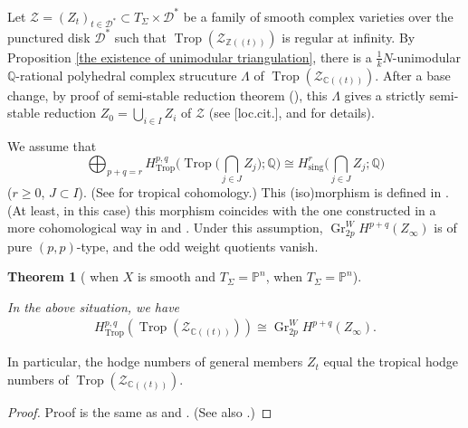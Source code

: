 \documentclass[12pt,a4]{amsart}
\newtheorem{thm}{Theorem}[section]
\def\P{\mathbb{P}}
\def\Q{\mathbb{Q}}
\def\Gr{\mathop{\mathrm{Gr}}\nolimits}
\def\sing{\mathop{\mathrm{sing}}\nolimits}
\def\Trop{\mathop{\mathrm{trop}}\nolimits}
\def\Trop{\mathop{\mathrm{Trop}}\nolimits}
\def\Gr{\mathop{\mathrm{Gr}}\nolimits}
\numberwithin{equation}{section}
\numberwithin{figure}{section}
\begin{document}
  Let  
   $\mathcal{Z} = (Z_t)_{t \in \mathcal{D}^*} \subset T_{\Sigma} \times \mathcal{D}^{*}$ 
   be a family 
   of smooth complex varieties 
   over the punctured disk $\mathcal{D}^*$
   such that $\Trop(\mathcal{Z}_{\mathbb{Z}((t))})$ is regular at infinity.
   By Proposition \ref{the existence of unimodular triangulation}, 
   there is a 
   $\frac{1}{k}N$-unimodular
    $\Q$-rational polyhedral complex strucuture $\Lambda$
    of $\Trop(\mathcal{Z}_{\mathbb{C}((t))})$.
   After a base change, 
   by proof of semi-stable reduction theorem (\cite{KempfKnudsenMumfordSaint-DonatToroidalEmbeddings11973}), 
   this $\Lambda$ gives 
   a strictly semi-stable reduction 
    $Z_0 = \bigcup_{i \in I} Z_i$ 
   of $\mathcal{Z}$ (see [loc.cit.], 
  \cite{ItenbergKatzarkovMikhalkinZharkovTropicalhomology2019}
  and 
  \cite{AksnesAminiPiquerezShawCOHOMOLOGICALLYTROPICALVARIETIES2025} 
  for details).

   We assume that 
   $$ 
    \bigoplus_{p+q=r} 
    H^{p,q}_{\Trop} \big( \Trop \big( \bigcap_{j \in J} Z_j \big); \Q \big) \cong 
      H^{r}_{\sing} \big( \bigcap_{j \in J} Z_j ; \Q \big) $$
      ($r \geq 0$, $J \subset I$).
  (See  for tropical cohomology.) 
      This (iso)morphism is defined in \cite[Definition 3.1]{AksnesAminiPiquerezShawCOHOMOLOGICALLYTROPICALVARIETIES2025}.  
      (At least, in this case) this morphism coincides with the one constructed in a more cohomological way in \cite{MikamiDifferentialformsandcohomologyintropicalandcomplexgeometry2021} and \cite[Section 7]{MikamiTropicalIntersectionHomology2024}.
      Under this assumption, 
      $\Gr_{2p}^W H^{p+q} (Z_{\infty})$ is of pure $(p,p)$-type,  and 
   the odd weight quotients vanish. 

  \begin{thm}[\cite{ItenbergKatzarkovMikhalkinZharkovTropicalhomology2019} 
  when $X$ is smooth and $T_{\Sigma} =\P^n$,
   \cite{AksnesAminiPiquerezShawCOHOMOLOGICALLYTROPICALVARIETIES2025} 
   when $T_{\Sigma} =\P^n$] \label{cohomology comparison in sm projective toric varieties:label}
   
   In the above situation, 
   we have 
   \begin{align*}
   H^{p,q}_{\Trop}(
    \Trop(\mathcal{Z}_{\mathbb{C}((t))}))
   \cong 
   \Gr_{2p}^W H^{p+q} (Z_{\infty}).
   \end{align*}
  \end{thm}
  In particular, 
   the hodge numbers of general members $Z_t$
   equal the tropical hodge numbers of $
    \Trop(\mathcal{Z}_{\mathbb{C}((t))})$.
    \begin{proof}
    Proof is the same as 
   \cite[Theorem 1]{ItenbergKatzarkovMikhalkinZharkovTropicalhomology2019}
   and 
   \cite[Theorem 7.1]{AksnesAminiPiquerezShawCOHOMOLOGICALLYTROPICALVARIETIES2025}.
   (See also .)
    \end{proof}
\end{document}
